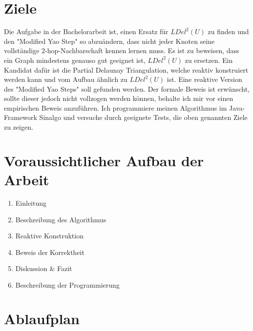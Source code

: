 \documentclass[a4paper,DIV10,10pt,headsepline,smallheadings]{scrreprt}
\begin{document}
\section{Ziele}
Die Aufgabe in der Bachelorarbeit ist, einen Ersatz für $LDel^2(U) $ zu finden und den "Modified Yao Step" so abzuändern, dass nicht jeder Knoten seine vollständige 2-hop-Nachbarschaft kennen lernen muss.
Es ist zu beweisen, dass ein Graph mindestens genauso gut geeignet ist, $LDel^2(U) $ zu ersetzen.
Ein Kandidat dafür ist die Partial Delaunay Triangulation, welche reaktiv konstruiert werden kann und vom Aufbau ähnlich zu $LDel^2(U) $ ist.
Eine reaktive Version des "Modified Yao Steps" soll gefunden werden.
Der formale Beweis ist erwünscht, sollte dieser jedoch nicht vollzogen werden können, behalte ich mir vor einen empirischen Beweis anzuführen.
Ich programmiere meinen Algorithmus im Java-Framework Sinalgo und versuche durch geeignete Tests, die oben genannten Ziele zu zeigen.

\section{Voraussichtlicher Aufbau der Arbeit}
\begin{enumerate}
\item Einleitung
\item Beschreibung des Algorithmus
\item Reaktive Konstruktion
\item Beweis der Korrektheit
\item Diskussion & Fazit
\item Beschreibung der Programmierung
\end{enumerate}

\section{Ablaufplan}

\begin{table}[h]
\end{table}
\end{document}
